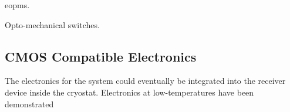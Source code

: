 \acp{eopm}.

Opto-mechanical switches.

\subsection{CMOS Compatible Electronics}

The electronics for the system could eventually be integrated into the receiver device inside the cryostat. Electronics at low-temperatures have been demonstrated \cite{bardin2019}

